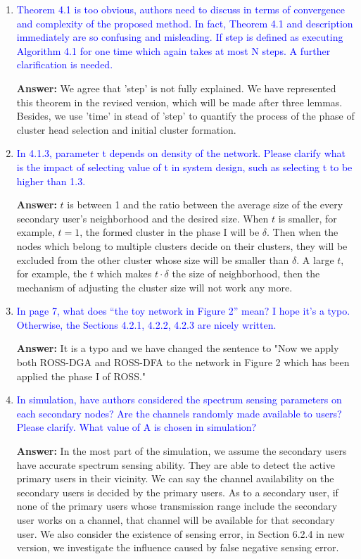 \documentclass[10pt,a4paper]{article}
\begin{document}
\begin{enumerate}
\item \textcolor{blue}{  Theorem 4.1 is too obvious, authors need to discuss in terms of convergence and complexity of the proposed method. In fact, Theorem 4.1 and description immediately are so confusing and misleading. If step is defined as executing Algorithm 4.1 for one time which again takes at most N steps. A further clarification is needed.}

\textbf{Answer:} We agree that 'step' is not fully explained.
	We have represented this theorem in the revised version, which will be made after three lemmas.
	Besides, we use 'time' in stead of 'step' to quantify the process of the phase of cluster head selection and initial cluster formation.
	
	
\item \textcolor{blue}{  In 4.1.3, parameter t depends on density of the network. Please clarify what is the impact of selecting value of t in system design, such as selecting t to be higher than 1.3.}

\textbf{Answer:}	$t$ is between 1 and the ratio between the average size of the every secondary user's neighborhood and the desired size.
	When $t$ is smaller, for example, $t=1$, the formed cluster in the phase I will be $\delta$.
	Then when the nodes which belong to multiple clusters decide on their clusters, they will be excluded from the other cluster whose size will be smaller than $\delta$.
	A large $t$, for example, the $t$ which makes $t\cdot\delta$ the size of neighborhood, then the mechanism of adjusting the cluster size will not work any more.

    
\item \textcolor{blue}{  In page 7, what does “the toy network in Figure 2” mean? I hope it’s a typo. Otherwise, the Sections 4.2.1, 4.2.2, 4.2.3 are nicely written.}

\textbf{Answer:} It is a typo and we have changed the sentence to "Now we apply both ROSS-DGA and ROSS-DFA to the network in Figure 2 which has been applied the phase I of ROSS."
    
\item \textcolor{blue}{  In simulation, have authors considered the spectrum sensing parameters on each secondary nodes? Are the channels randomly made available to users? Please clarify. What value of A is chosen in simulation?}

\textbf{Answer:} In the most part of the simulation, we assume the secondary users have accurate spectrum sensing ability.
They are able to detect the active primary users in their vicinity.
We can say the channel availability on the secondary users is decided by the primary users.
As to a secondary user, if none of the primary users whose transmission range include the secondary user works on a channel, that channel will be available for that secondary user. 
We also consider the existence of sensing error, in Section 6.2.4 in new version, we investigate the influence caused by false negative sensing error.


\end{enumerate}
\end{document}
